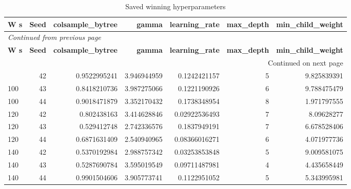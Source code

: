 \documentclass[10pt,a4paper]{article}
\begin{document}
\begingroup\small\setlength{\tabcolsep}{4pt}\renewcommand{\arraystretch}{1.12}
\begin{longtable}{@{}lrrrrrr@{}}
\caption{Saved winning hyperparameters}\\
\toprule
\textbf{W s} & \textbf{Seed} & \textbf{colsample\_\allowbreak{}bytree} & \textbf{gamma} & \textbf{learning\_\allowbreak{}rate} & \textbf{max\_\allowbreak{}depth} & \textbf{min\_\allowbreak{}child\_\allowbreak{}weight} \\
\midrule\endfirsthead
\multicolumn{7}{l}{\small\itshape Continued from previous page}\\
\toprule
\textbf{W s} & \textbf{Seed} & \textbf{colsample\_\allowbreak{}bytree} & \textbf{gamma} & \textbf{learning\_\allowbreak{}rate} & \textbf{max\_\allowbreak{}depth} & \textbf{min\_\allowbreak{}child\_\allowbreak{}weight} \\
\midrule\endhead
\midrule\multicolumn{7}{r}{\small Continued on next page}\\\endfoot
\bottomrule\endlastfoot
100 & 42 & 0.9522995241 & 3.946944959 & 0.1242421157 & 5 & 9.825839391 \\
100 & 43 & 0.8418210736 & 3.987275066 & 0.1221190926 & 6 & 9.788475479 \\
100 & 44 & 0.9018471879 & 3.352170432 & 0.1738348954 & 8 & 1.971797555 \\
120 & 42 & 0.802438163 & 3.414628846 & 0.02922536493 & 7 & 8.09628277 \\
120 & 43 & 0.529412748 & 2.742336576 & 0.1837949191 & 7 & 6.678528406 \\
120 & 44 & 0.6871631409 & 2.540940965 & 0.08366016271 & 6 & 4.071977736 \\
140 & 42 & 0.5370192984 & 2.988757342 & 0.03253853848 & 5 & 9.009581075 \\
140 & 43 & 0.5287690784 & 3.595019549 & 0.09711487981 & 4 & 4.435658449 \\
140 & 44 & 0.9901504606 & 3.905773741 & 0.1122951052 & 5 & 5.343995981 \\
\end{longtable}\endgroup
\begingroup\small\setlength{\tabcolsep}{4pt}\renewcommand{\arraystretch}{1.12}
\end{document}
